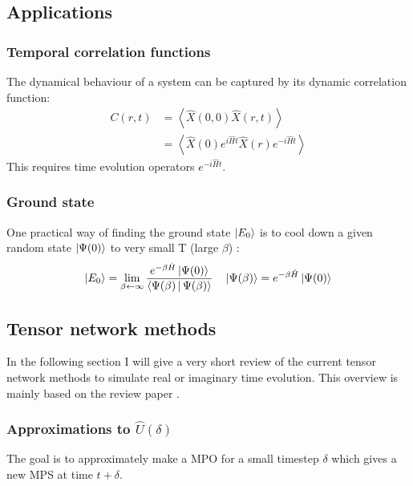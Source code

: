 \subsection{Applications}

\subsubsection{Temporal correlation functions}
The dynamical behaviour of a system can be captured by its dynamic correlation function:
\begin{equation}
    \begin{split}
        C(r,t) &= \left<  \hat{X}(0,0) \hat{X}(r,t)  \right >\\
        &=  \left<  \hat{X}(0)  e^{i \hat{H} t}  \hat{X}(r)  e^{-i \hat{H} t}   \right >
    \end{split}
\end{equation}
This requires time evolution operators $e^{-i \hat{H} t}$.

\subsubsection{Ground state}
One practical way of finding the ground state $ \ket{E_0}$ is to cool down a given random state $ \ket{\Psi(0)}$ to very small T (large $\beta$) \cite{Orus2014}:
\begin{equation}
    \ket{E_0} = \lim_{\beta \leftarrow \infty} \frac{e^{-\beta \hat{H} } \ket{\Psi(0)}  }{  \Braket{ \Psi(\beta) | \Psi(\beta) }  } \quad  \ket{\Psi(\beta)} =  e^{-\beta \hat{H} } \ket{\Psi(0)}
\end{equation}

\subsection{Tensor network methods}\label{rt_tn_methods}
In the following section I will give a very short review of the current tensor network methods to simulate real or imaginary time evolution. This overview is mainly based on the review paper \cite{Paeckel2019}.


\subsubsection{Approximations to  \texorpdfstring{$ \hat{U}(\delta)$}{U}   }
The goal is to approximately make a MPO for a small timestep $\delta$ which gives a new MPS at time $t+\delta$.
